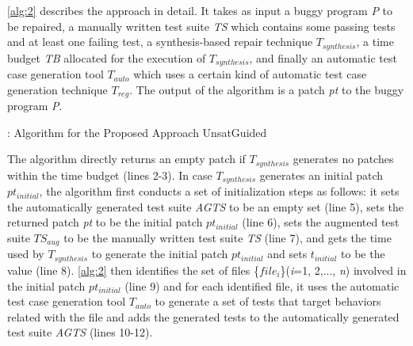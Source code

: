 \autoref{alg:2} describes the approach in detail. 
It takes as input a buggy program \emph{P} to be repaired, a manually written test suite \emph{TS} which contains some passing tests and at least one failing test, a synthesis-based repair technique $T_{synthesis}$, a time budget \emph{TB} allocated for the execution of $T_{synthesis}$, and finally an automatic test case generation tool $T_{auto}$ which uses a certain kind of automatic test case generation technique $T_{reg}$. 
The output of the algorithm is a patch \emph{pt} to the buggy program \emph{P}.

\begin{algorithm}[t]
	\begin{algorithmic}[1]
		\Else
			\EndFor
				\Else
				\EndIf
			\EndFor
		\EndIf
	\end{algorithmic}
	\caption{: Algorithm for the Proposed Approach UnsatGuided}
	\label{alg:2}
\end{algorithm}

The algorithm directly returns an empty patch if $T_{synthesis}$ generates no patches within the time budget (lines 2-3).
In case $T_{synthesis}$ generates an initial patch $pt_{initial}$, the algorithm first conducts a set of initialization steps as follows: 
it sets the automatically generated test suite \emph{AGTS} to be an empty set (line 5), sets the returned patch \emph{pt} to be the initial patch $pt_{initial}$ (line 6), sets the augmented test suite $TS_{aug}$ to be the manually written test suite \emph{TS} (line 7), and gets the time used by $T_{synthesis}$ to generate the initial patch $pt_{initial}$ and sets $t_{initial}$ to be the value (line 8).
\autoref{alg:2} then identifies the set of files \{$file_i$\}(\emph{i}=1, 2,..., \emph{n}) involved in the initial patch $pt_{initial}$ (line 9) and for each identified file, it uses the automatic test case generation tool $T_{auto}$ to generate a set of tests that target behaviors related with the file and adds the generated tests to the automatically generated test suite \emph{AGTS} (lines 10-12). 

